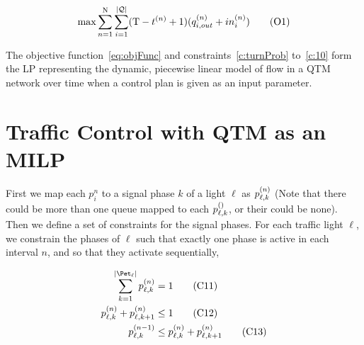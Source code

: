 

\begin{equation}
\max 
 \sum_{n=1}^{\Nn} \sum_{i=1}^{\Qn} (\TMAX - \tn + 1) (\qout{i} + \inq{i})
\tag{O1}\label{eq:objFunc}
\end{equation}



The objective function~\eqref{eq:objFunc} and constraints~\eqref{c:turnProb}
to~\eqref{c:10} form the LP representing the dynamic, piecewise linear model of
flow in a QTM network over time when a control plan  is given as an
input parameter.




\section{Traffic Control with QTM as an MILP}






First we map each $p_i^n$ to a signal phase $k$ of a light $\ell$ as
$\p{\ell}{k}$ (Note that there could be more than one queue mapped to each
$\p[]{\ell}{k}$, or their could be none). Then we define a set of constraints
for the signal phases. For each traffic light $\ell$, we constrain the phases of
$\ell$ such that exactly one phase is active in each interval $n$, and so that
they activate sequentially,

\begin{align}
\sum\limits_{k=1}^{\Pn} \p{\ell}{k} &= 1\tag{C11}\label{eq:C11}\\
\p{\ell}{k} + \p{\ell}{k+1} &\le 1\tag{C12}\label{eq:C12}\\
\p[n-1]{\ell}{k} &\le \p{\ell}{k} + \p{\ell}{k+1}\tag{C13}\label{eq:C13}
\end{align}

